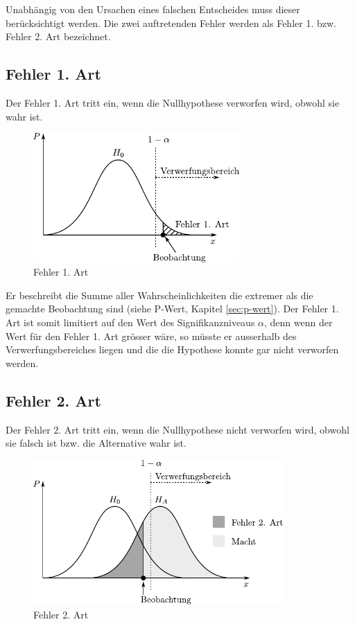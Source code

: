 Unabhängig von den Ursachen eines falschen Entscheides muss dieser 
berücksichtigt werden. Die zwei auftretenden Fehler werden als
Fehler 1. bzw. Fehler 2. Art bezeichnet.

\subsection{Fehler 1. Art}
Der Fehler 1. Art tritt ein, wenn die Nullhypothese verworfen wird, obwohl 
sie wahr ist. 

\begin{figure}[h!]
	\centering
        \includegraphics[width=0.7\textwidth]{fehler-erster-art.pdf}
	\caption{Fehler 1. Art}
	\label{fig:fehler1}
\end{figure}

Er beschreibt die Summe aller Wahrscheinlichkeiten die extremer als die 
gemachte Beobachtung sind (siehe P-Wert, Kapitel \ref{sec:p-wert}). 
Der Fehler 1. Art ist somit limitiert auf den Wert des Signifikanzniveaus 
$\alpha$, denn wenn der Wert für den Fehler 1. Art grösser wäre, so müsste 
er ausserhalb des Verwerfungsbereiches liegen und die die Hypothese konnte 
gar nicht verworfen werden.

\subsection{Fehler 2. Art}
Der Fehler 2. Art tritt ein, wenn die Nullhypothese nicht verworfen wird, 
obwohl sie falsch ist bzw. die Alternative wahr ist.

\begin{figure}[h!]
	\centering
	\includegraphics[width=0.85\textwidth]{fehler-zweiter-art.pdf}
	\caption{Fehler 2. Art}
	\label{fig:fehler2}
\end{figure}

